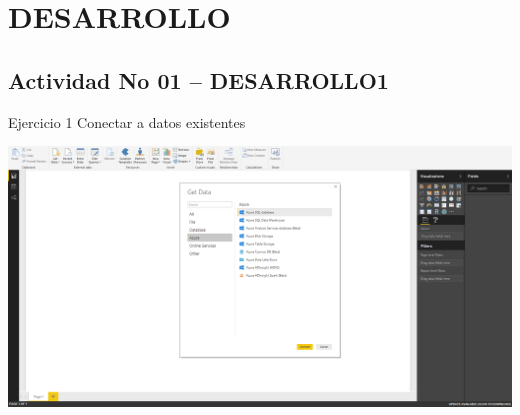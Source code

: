 \section{DESARROLLO}

\subsection{Actividad No 01 – DESARROLLO1}

Ejercicio 1  Conectar a datos existentes \\
	\begin{center}
	\includegraphics[width=15cm]{./Imagenes/EJER1T1(1)}
	\end{center}	


